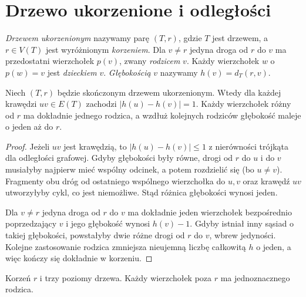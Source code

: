 \section{Drzewo ukorzenione i odległości}
\label{sec:tg-ukorzenione}

\begin{definicja}
\emph{Drzewem ukorzenionym} nazywamy parę
$(T,r)$, gdzie $T$ jest drzewem, a
$r\in V(T)$ jest wyróżnionym
\emph{korzeniem}. Dla $v\ne r$ jedyna droga
od $r$ do $v$ ma przedostatni wierzchołek
$p(v)$, zwany \emph{rodzicem} $v$. Każdy
wierzchołek $w$ o $p(w)=v$ jest \emph{dzieckiem}
$v$. \emph{Głębokością} $v$ nazywamy
$h(v)=d_T(r,v)$.
\end{definicja}

\begin{stwierdzenie}
Niech $(T,r)$ będzie skończonym drzewem
ukorzenionym. Wtedy dla każdej krawędzi
$uv\in E(T)$ zachodzi $|h(u)-h(v)|=1$.
Każdy wierzchołek różny od $r$ ma dokładnie
jednego rodzica, a wzdłuż kolejnych rodziców
głębokość maleje o jeden aż do $r$.
\end{stwierdzenie}

\begin{proof}
Jeżeli $uv$ jest krawędzią, to
$|h(u)-h(v)|\le1$ z nierówności trójkąta
dla odległości grafowej. Gdyby głębokości
były równe, drogi od $r$ do $u$ i do $v$
musiałyby najpierw mieć wspólny odcinek,
a potem rozdzielić się (bo $u\ne v$).
Fragmenty obu dróg od ostatniego wspólnego
wierzchołka do $u,v$ oraz krawędź $uv$
utworzyłyby cykl, co jest niemożliwe.
Stąd różnica głębokości wynosi jeden.

Dla $v\ne r$ jedyna droga od $r$ do $v$
ma dokładnie jeden wierzchołek bezpośrednio
poprzedzający $v$ i jego głębokość wynosi
$h(v)-1$. Gdyby istniał inny sąsiad o
takiej głębokości, powstałyby dwie różne
drogi od $r$ do $v$, wbrew jedyności.
Kolejne zastosowanie rodzica zmniejsza
nieujemną liczbę całkowitą $h$ o jeden,
a więc kończy się dokładnie w korzeniu.
\end{proof}

\begin{center}

{\footnotesize Korzeń $r$ i trzy poziomy drzewa.
Każdy wierzchołek poza $r$ ma jednoznacznego rodzica.}
\end{center}

